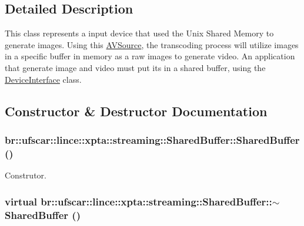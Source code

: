 \subsection{Detailed Description}
This class represents a input device that used the Unix Shared Memory to generate images. Using this \hyperlink{classbr_1_1ufscar_1_1lince_1_1xpta_1_1streaming_1_1AVSource}{AVSource}, the transcoding process will utilize images in a specific buffer in memory as a raw images to generate video. An application that generate image and video must put its in a shared buffer, using the \hyperlink{classbr_1_1ufscar_1_1lince_1_1xpta_1_1streaming_1_1DeviceInterface}{DeviceInterface} class. 

\subsection{Constructor \& Destructor Documentation}
\hypertarget{classbr_1_1ufscar_1_1lince_1_1xpta_1_1streaming_1_1SharedBuffer_a3584d2e0791ac212f349212444c33e42}{
\subsubsection[{SharedBuffer}]{\setlength{\rightskip}{0pt plus 5cm}br::ufscar::lince::xpta::streaming::SharedBuffer::SharedBuffer ()}}
\label{classbr_1_1ufscar_1_1lince_1_1xpta_1_1streaming_1_1SharedBuffer_a3584d2e0791ac212f349212444c33e42}


Construtor. 

\hypertarget{classbr_1_1ufscar_1_1lince_1_1xpta_1_1streaming_1_1SharedBuffer_ae5f5dafbf00e8d38d19b02e1815c7857}{
\subsubsection[{$\sim$SharedBuffer}]{\setlength{\rightskip}{0pt plus 5cm}virtual br::ufscar::lince::xpta::streaming::SharedBuffer::$\sim$SharedBuffer ()}}
\label{classbr_1_1ufscar_1_1lince_1_1xpta_1_1streaming_1_1SharedBuffer_ae5f5dafbf00e8d38d19b02e1815c7857}


